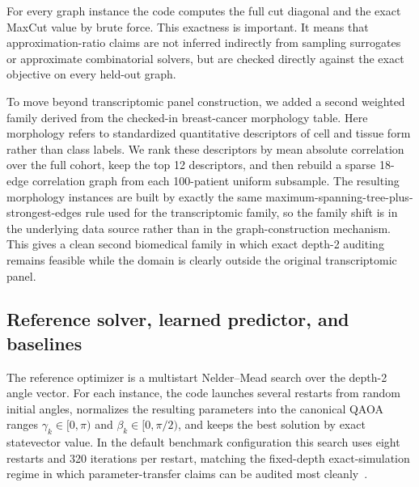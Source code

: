 \documentclass[
  reprint,
  twocolumn,
  aps,
  superscriptaddress,
  longbibliography,
  floatfix
]{revtex4-2}
\begin{document}
For every graph instance the code computes the full cut diagonal and the exact MaxCut value by brute force. This exactness is important. It means that approximation-ratio claims are not inferred indirectly from sampling surrogates or approximate combinatorial solvers, but are checked directly against the exact objective on every held-out graph.

To move beyond transcriptomic panel construction, we added a second weighted family derived from the checked-in breast-cancer morphology table. Here morphology refers to standardized quantitative descriptors of cell and tissue form rather than class labels. We rank these descriptors by mean absolute correlation over the full cohort, keep the top 12 descriptors, and then rebuild a sparse 18-edge correlation graph from each 100-patient uniform subsample. The resulting morphology instances are built by exactly the same maximum-spanning-tree-plus-strongest-edges rule used for the transcriptomic family, so the family shift is in the underlying data source rather than in the graph-construction mechanism. This gives a clean second biomedical family in which exact depth-2 auditing remains feasible while the domain is clearly outside the original transcriptomic panel.

\subsection{Reference solver, learned predictor, and baselines}
The reference optimizer is a multistart Nelder--Mead search over the depth-2 angle vector. For each instance, the code launches several restarts from random initial angles, normalizes the resulting parameters into the canonical QAOA ranges $\gamma_k \in [0,\pi)$ and $\beta_k \in [0,\pi/2)$, and keeps the best solution by exact statevector value. In the default benchmark configuration this search uses eight restarts and 320 iterations per restart, matching the fixed-depth exact-simulation regime in which parameter-transfer claims can be audited most cleanly~\cite{zhou2020,galda2021}.
\end{document}
